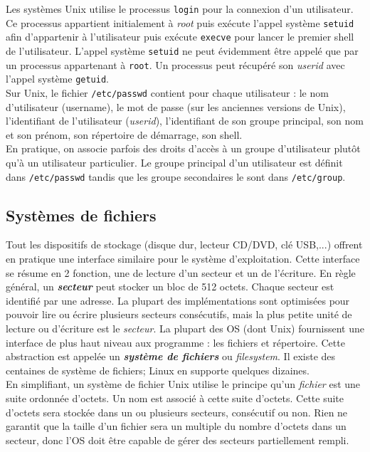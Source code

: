 Les systèmes Unix utilise le processus \texttt{login} pour la connexion d'un utilisateur. Ce processus appartient initialement à \textit{root} puis exécute l'appel système \texttt{setuid} afin d'appartenir à l'utilisateur puis exécute \texttt{execve} pour lancer le premier shell de l'utilisateur. L'appel système \texttt{setuid} ne peut évidemment être appelé que par un processus appartenant à \texttt{root}. Un processus peut récupéré son \textit{userid} avec l'appel système \texttt{getuid}.\\

Sur Unix, le fichier \texttt{/etc/passwd} contient pour chaque utilisateur : le nom d'utilisateur (username), le mot de passe (sur les anciennes versions de Unix), l'identifiant de l'utilisateur (\textit{userid}), l'identifiant de son groupe principal, son nom et son prénom, son répertoire de démarrage, son shell.\\

En pratique, on associe parfois des droits d'accès à un groupe d'utilisateur plutôt qu'à un utilisateur particulier. Le groupe principal d'un utilisateur est définit dans \texttt{/etc/passwd} tandis que les groupe secondaires le sont dans \texttt{/etc/group}.
\subsection{Systèmes de fichiers}
Tout les dispositifs de stockage (disque dur, lecteur CD/DVD, clé USB,...) offrent en pratique une interface similaire pour le système d'exploitation. Cette interface se résume en 2 fonction, une de lecture d'un secteur et un de l'écriture. En règle général, un \textit{\textbf{secteur}} peut stocker un bloc de 512 octets. Chaque secteur est identifié par une adresse. La plupart des implémentations sont optimisées pour pouvoir lire ou écrire plusieurs secteurs consécutifs, mais la plus petite unité de lecture ou d'écriture est le \textit{secteur}. La plupart des OS (dont Unix) fournissent une interface de plus haut niveau aux programme : les fichiers et répertoire. Cette abstraction est appelée un \textit{\textbf{système de fichiers}} ou \textit{filesystem}. Il existe des centaines de système de fichiers; Linux en supporte quelques dizaines. \\

En simplifiant, un système de fichier Unix utilise le principe qu'un \textit{fichier} est une suite ordonnée d'octets. Un nom est associé à cette suite d'octets. Cette suite d'octets sera stockée dans un ou plusieurs secteurs, consécutif ou non. Rien ne garantit que la taille d'un fichier sera un multiple du nombre d'octets dans un secteur, donc l'OS doit être capable de gérer des secteurs partiellement rempli.\\

